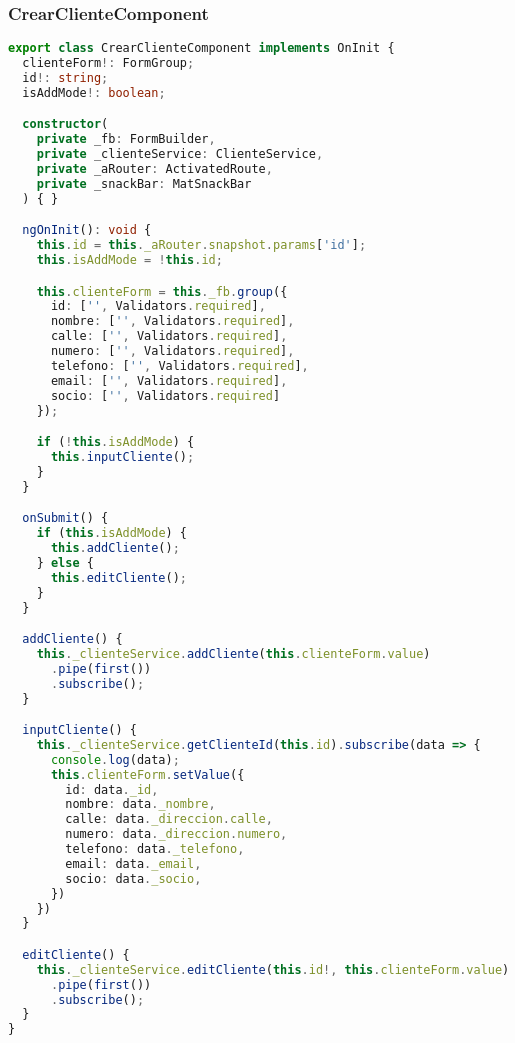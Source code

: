 \documentclass[a4paper]{article} %
\begin{document}
\subsubsection{CrearClienteComponent}
\begin{lstlisting}[language=Typescript]
	export class CrearClienteComponent implements OnInit {
  clienteForm!: FormGroup;
  id!: string;
  isAddMode!: boolean;

  constructor(
    private _fb: FormBuilder,
    private _clienteService: ClienteService,
    private _aRouter: ActivatedRoute,
    private _snackBar: MatSnackBar
  ) { }

  ngOnInit(): void {
    this.id = this._aRouter.snapshot.params['id'];
    this.isAddMode = !this.id;

    this.clienteForm = this._fb.group({
      id: ['', Validators.required],
      nombre: ['', Validators.required],
      calle: ['', Validators.required],
      numero: ['', Validators.required],
      telefono: ['', Validators.required],
      email: ['', Validators.required],
      socio: ['', Validators.required]
    });

    if (!this.isAddMode) {
      this.inputCliente();
    }
  }

  onSubmit() {
    if (this.isAddMode) {
      this.addCliente();
    } else {
      this.editCliente();
    }
  }

  addCliente() {
    this._clienteService.addCliente(this.clienteForm.value)
      .pipe(first())
      .subscribe();
  }

  inputCliente() {
    this._clienteService.getClienteId(this.id).subscribe(data => {
      console.log(data);
      this.clienteForm.setValue({
        id: data._id,
        nombre: data._nombre,
        calle: data._direccion.calle,
        numero: data._direccion.numero,
        telefono: data._telefono,
        email: data._email,
        socio: data._socio,
      })
    })
  }

  editCliente() {
    this._clienteService.editCliente(this.id!, this.clienteForm.value)
      .pipe(first())
      .subscribe();
  }
}
\end{lstlisting}\clearpage
\end{document}
